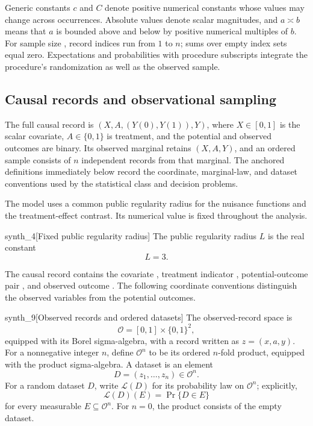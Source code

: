 \documentclass[11pt]{article}
\begin{document}
Generic constants \(c\) and \(C\) denote positive numerical constants whose values may change across occurrences. Absolute values denote scalar magnitudes, and \(a\asymp b\) means that \(a\) is bounded above and below by positive numerical multiples of \(b\). For sample size , record indices run from \(1\) to \(n\); sums over empty index sets equal zero. Expectations and probabilities with procedure subscripts integrate the procedure's randomization as well as the observed sample.

\subsection{Causal records and observational sampling}

The full causal record is \((X,A,(Y(0),Y(1)),Y)\), where \(X\in[0,1]\) is the scalar covariate, \(A\in\{0,1\}\) is treatment, and the potential and observed outcomes are binary. Its observed marginal retains \((X,A,Y)\), and an ordered sample consists of \(n\) independent records from that marginal. The anchored definitions immediately below record the coordinate, marginal-law, and dataset conventions used by the statistical class and decision problems.

The model uses a common public regularity radius  for the nuisance functions and the treatment-effect contrast. Its numerical value is fixed throughout the analysis.

\begin{definitionv}{synth_4}[Fixed public regularity radius]
The public regularity radius \(L\) is the real constant
\[
L = 3.
\]
\end{definitionv}

The causal record contains the covariate , treatment indicator , potential-outcome pair , and observed outcome . The following coordinate conventions distinguish the observed variables from the potential outcomes.

\begin{definitionv}{synth_9}[Observed records and ordered datasets]
The observed-record space is
\[
\mathcal O=[0,1]\times\{0,1\}^2,
\]
equipped with its Borel sigma-algebra, with a record written as \(z=(x,a,y)\). For a nonnegative integer \(n\), define \(\mathcal O^n\) to be its ordered \(n\)-fold product, equipped with the product sigma-algebra. A dataset is an element
\[
D=(z_1,\ldots,z_n)\in\mathcal O^n.
\]
For a random dataset \(D\), write \(\mathcal L(D)\) for its probability law on \(\mathcal O^n\); explicitly,
\[
\mathcal L(D)(E)=\Pr\{D\in E\}
\]
for every measurable \(E\subseteq\mathcal O^n\). For \(n=0\), the product consists of the empty dataset.
\end{definitionv}
\end{document}
